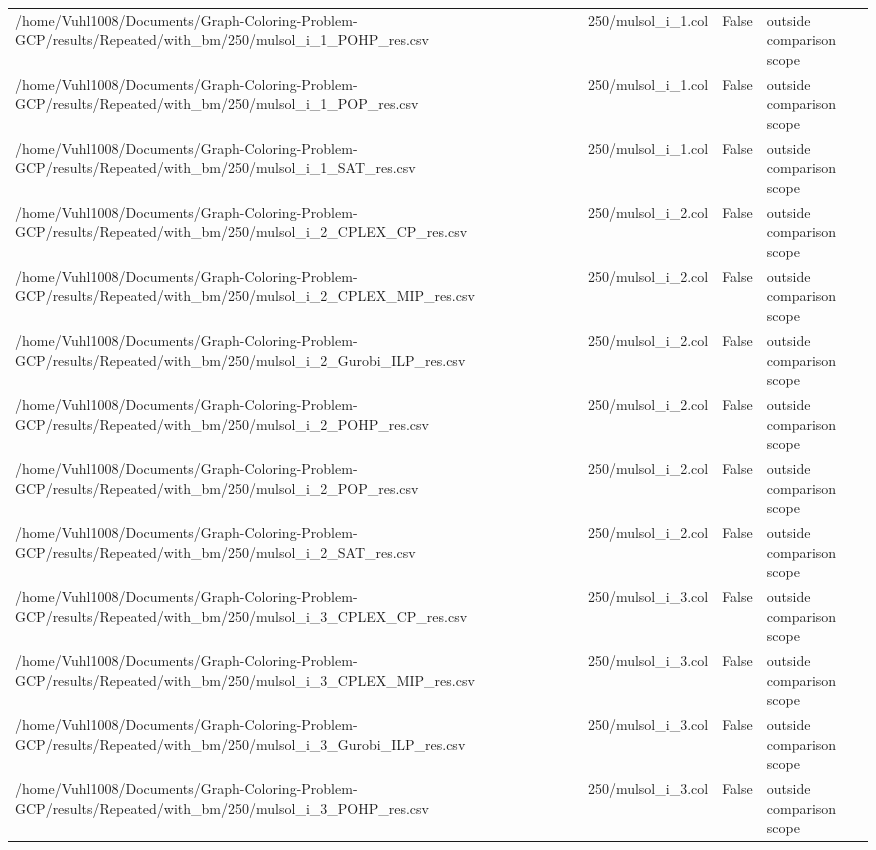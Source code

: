 \begin{table}[htbp]
\begin{tabular}{llll}
/home/Vuhl1008/Documents/Graph-Coloring-Problem-GCP/results/Repeated/with\_bm/250/mulsol\_i\_1\_POHP\_res.csv & 250/mulsol\_i\_1.col & False & outside comparison scope \\
/home/Vuhl1008/Documents/Graph-Coloring-Problem-GCP/results/Repeated/with\_bm/250/mulsol\_i\_1\_POP\_res.csv & 250/mulsol\_i\_1.col & False & outside comparison scope \\
/home/Vuhl1008/Documents/Graph-Coloring-Problem-GCP/results/Repeated/with\_bm/250/mulsol\_i\_1\_SAT\_res.csv & 250/mulsol\_i\_1.col & False & outside comparison scope \\
/home/Vuhl1008/Documents/Graph-Coloring-Problem-GCP/results/Repeated/with\_bm/250/mulsol\_i\_2\_CPLEX\_CP\_res.csv & 250/mulsol\_i\_2.col & False & outside comparison scope \\
/home/Vuhl1008/Documents/Graph-Coloring-Problem-GCP/results/Repeated/with\_bm/250/mulsol\_i\_2\_CPLEX\_MIP\_res.csv & 250/mulsol\_i\_2.col & False & outside comparison scope \\
/home/Vuhl1008/Documents/Graph-Coloring-Problem-GCP/results/Repeated/with\_bm/250/mulsol\_i\_2\_Gurobi\_ILP\_res.csv & 250/mulsol\_i\_2.col & False & outside comparison scope \\
/home/Vuhl1008/Documents/Graph-Coloring-Problem-GCP/results/Repeated/with\_bm/250/mulsol\_i\_2\_POHP\_res.csv & 250/mulsol\_i\_2.col & False & outside comparison scope \\
/home/Vuhl1008/Documents/Graph-Coloring-Problem-GCP/results/Repeated/with\_bm/250/mulsol\_i\_2\_POP\_res.csv & 250/mulsol\_i\_2.col & False & outside comparison scope \\
/home/Vuhl1008/Documents/Graph-Coloring-Problem-GCP/results/Repeated/with\_bm/250/mulsol\_i\_2\_SAT\_res.csv & 250/mulsol\_i\_2.col & False & outside comparison scope \\
/home/Vuhl1008/Documents/Graph-Coloring-Problem-GCP/results/Repeated/with\_bm/250/mulsol\_i\_3\_CPLEX\_CP\_res.csv & 250/mulsol\_i\_3.col & False & outside comparison scope \\
/home/Vuhl1008/Documents/Graph-Coloring-Problem-GCP/results/Repeated/with\_bm/250/mulsol\_i\_3\_CPLEX\_MIP\_res.csv & 250/mulsol\_i\_3.col & False & outside comparison scope \\
/home/Vuhl1008/Documents/Graph-Coloring-Problem-GCP/results/Repeated/with\_bm/250/mulsol\_i\_3\_Gurobi\_ILP\_res.csv & 250/mulsol\_i\_3.col & False & outside comparison scope \\
/home/Vuhl1008/Documents/Graph-Coloring-Problem-GCP/results/Repeated/with\_bm/250/mulsol\_i\_3\_POHP\_res.csv & 250/mulsol\_i\_3.col & False & outside comparison scope \\

\end{tabular}
\end{table}

